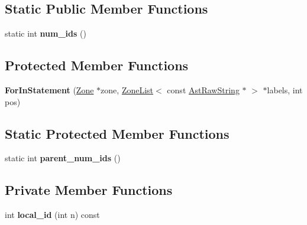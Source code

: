 \subsection*{Static Public Member Functions}
\begin{DoxyCompactItemize}
\item 
static int {\bfseries num\+\_\+ids} ()\hypertarget{classv8_1_1internal_1_1_for_in_statement_a32bfa97d6670286dfa461225ccd5dedf}{}\label{classv8_1_1internal_1_1_for_in_statement_a32bfa97d6670286dfa461225ccd5dedf}

\end{DoxyCompactItemize}
\subsection*{Protected Member Functions}
\begin{DoxyCompactItemize}
\item 
{\bfseries For\+In\+Statement} (\hyperlink{classv8_1_1internal_1_1_zone}{Zone} $\ast$zone, \hyperlink{classv8_1_1internal_1_1_zone_list}{Zone\+List}$<$ const \hyperlink{classv8_1_1internal_1_1_ast_raw_string}{Ast\+Raw\+String} $\ast$ $>$ $\ast$labels, int pos)\hypertarget{classv8_1_1internal_1_1_for_in_statement_a595f3ce0aeea3e888c80307f5fadc0b4}{}\label{classv8_1_1internal_1_1_for_in_statement_a595f3ce0aeea3e888c80307f5fadc0b4}

\end{DoxyCompactItemize}
\subsection*{Static Protected Member Functions}
\begin{DoxyCompactItemize}
\item 
static int {\bfseries parent\+\_\+num\+\_\+ids} ()\hypertarget{classv8_1_1internal_1_1_for_in_statement_ac7c9d773e208cd4fd23ec66aacf97b9e}{}\label{classv8_1_1internal_1_1_for_in_statement_ac7c9d773e208cd4fd23ec66aacf97b9e}

\end{DoxyCompactItemize}
\subsection*{Private Member Functions}
\begin{DoxyCompactItemize}
\item 
int {\bfseries local\+\_\+id} (int n) const \hypertarget{classv8_1_1internal_1_1_for_in_statement_aad88fc22d5af2b036c1109f7e5d05013}{}\label{classv8_1_1internal_1_1_for_in_statement_aad88fc22d5af2b036c1109f7e5d05013}

\end{DoxyCompactItemize}
